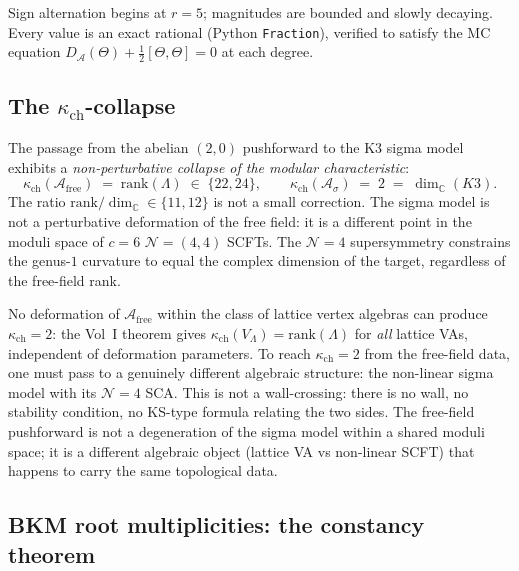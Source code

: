 \documentclass[11pt]{article}
\newcommand{\cA}{\mathcal{A}}
\newcommand{\cN}{\mathcal{N}}
\newcommand{\C}{\mathbb{C}}
\begin{document}
\noindent Sign alternation begins at $r = 5$; magnitudes are bounded and slowly decaying. Every value is an exact rational (Python \texttt{Fraction}), verified to satisfy the MC equation $D_{\cA}(\Theta) + \tfrac{1}{2}[\Theta, \Theta] = 0$ at each degree.

\subsection{The $\kappa_{\mathrm{ch}}$-collapse}
\label{subsec:kappa-collapse}

\begin{observation}[$\kappa_{\mathrm{ch}}$-collapse: rank $\to$ $\dim_\C$]
\label{obs:kappa-collapse}
The passage from the abelian $(2,0)$ pushforward to the K3 sigma model exhibits a \emph{non-perturbative collapse of the modular characteristic}:
\[
 \kappa_{\mathrm{ch}}(\cA_{\mathrm{free}}) \;=\; \mathrm{rank}(\Lambda) \;\in\; \{22, 24\},
 \qquad
 \kappa_{\mathrm{ch}}(\cA_\sigma) \;=\; 2 \;=\; \dim_\C(K3).
\]
The ratio $\mathrm{rank}/\dim_\C \in \{11, 12\}$ is not a small correction. The sigma model is not a perturbative deformation of the free field: it is a different point in the moduli space of $c = 6$ $\cN = (4,4)$ SCFTs. The $\cN = 4$ supersymmetry constrains the genus-$1$ curvature to equal the complex dimension of the target, regardless of the free-field rank.
\end{observation}

\begin{warning}
\label{warn:structural-gap}
No deformation of $\cA_{\mathrm{free}}$ within the class of lattice vertex algebras can produce $\kappa_{\mathrm{ch}} = 2$: the Vol~I theorem gives $\kappa_{\mathrm{ch}}(V_\Lambda) = \mathrm{rank}(\Lambda)$ for \emph{all} lattice VAs, independent of deformation parameters. To reach $\kappa_{\mathrm{ch}} = 2$ from the free-field data, one must pass to a genuinely different algebraic structure: the non-linear sigma model with its $\cN = 4$ SCA. This is not a wall-crossing: there is no wall, no stability condition, no KS-type formula relating the two sides. The free-field pushforward is not a degeneration of the sigma model within a shared moduli space; it is a different algebraic object (lattice VA vs non-linear SCFT) that happens to carry the same topological data.
\end{warning}

\subsection{BKM root multiplicities: the constancy theorem}
\label{subsec:bkm-constancy}
\end{document}
